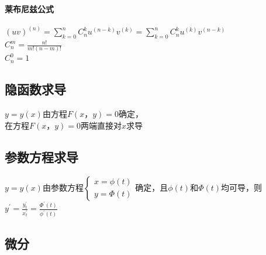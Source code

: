 \documentclass{article}
\begin{document}
\begin{flushleft}
	\paragraph{莱布尼兹公式}
	$(uv)^{(n)} = \sum\limits_{k=0}^{n} C_n^k u^{(n-k)} v^{(k)} = \sum\limits_{k=0}^{n} C_n^k u^{(k)} v^{(n-k)}$\\
	$C_n^m=\frac{n!}{m!(n-m)!}$\\
	$C_n^0=1$\\
	
	\subsection{隐函数求导}
	
	$y=y(x)$由方程$F(x，y)=0$确定，\\
	在方程$F(x，y)=0$两端直接对$x$求导\\
	
	\subsection{参数方程求导}
	
	$y=y(x)$由参数方程$\left\{
	\begin{array}{rcl}
	x=\phi(t)\\
	y=\Phi(t)
	\end{array} \right.$确定，且$\phi(t)$和$\Phi(t)$均可导，则$y^{'}=\frac{y^{'}_t}{x^{'}_t}=\frac{\Phi^{'}(t)}{\phi^{'}(t)}$\\
	
	\subsection{微分}
	

\end{flushleft}
\end{document}
